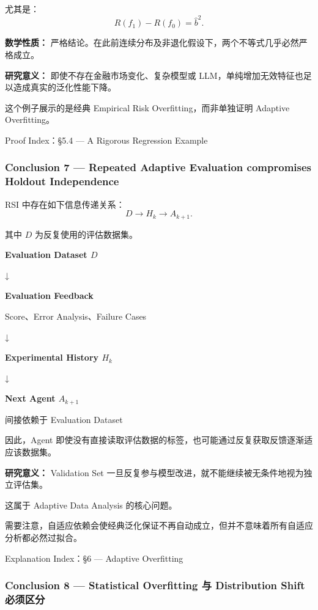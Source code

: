 尤其是：
\[R(f_1)-R(f_0)=\hat b^2.\]

\textbf{数学性质：} 严格结论。在此前连续分布及非退化假设下，两个不等式几乎必然严格成立。

\textbf{研究意义：} 即使不存在金融市场变化、复杂模型或 LLM，单纯增加无效特征也足以造成真实的泛化性能下降。

这个例子展示的是经典 Empirical Risk Overfitting，而非单独证明 Adaptive Overfitting。

Proof Index：§5.4 --- A Rigorous Regression Example

\hypertarget{part-1-10-0001-conclusion-7-repeated-adaptive-evaluation-compromises-holdout-independence}{%
\subsubsection{Conclusion 7 --- Repeated Adaptive Evaluation compromises Holdout Independence}\label{part-1-10-0001-conclusion-7-repeated-adaptive-evaluation-compromises-holdout-independence}}

RSI 中存在如下信息传递关系：
\[D
\longrightarrow H_k
\longrightarrow A_{k+1}.\]

其中 \(D\) 为反复使用的评估数据集。

\textbf{Evaluation Dataset \(D\)}

↓

\textbf{Evaluation Feedback}

Score、Error Analysis、Failure Cases

↓

\textbf{Experimental History \(H_k\)}

↓

\textbf{Next Agent \(A_{k+1}\)}

间接依赖于 Evaluation Dataset

因此，Agent 即使没有直接读取评估数据的标签，也可能通过反复获取反馈逐渐适应该数据集。

\textbf{研究意义：} Validation Set 一旦反复参与模型改进，就不能继续被无条件地视为独立评估集。

这属于 Adaptive Data Analysis 的核心问题。

需要注意，自适应依赖会使经典泛化保证不再自动成立，但并不意味着所有自适应分析都必然过拟合。

Explanation Index：§6 --- Adaptive Overfitting

\hypertarget{part-1-10-0001-conclusion-8-statistical-overfitting-ux4e0e-distribution-shift-ux5fc5ux987bux533aux5206}{%
\subsubsection{Conclusion 8 --- Statistical Overfitting 与 Distribution Shift 必须区分}\label{part-1-10-0001-conclusion-8-statistical-overfitting-ux4e0e-distribution-shift-ux5fc5ux987bux533aux5206}}

